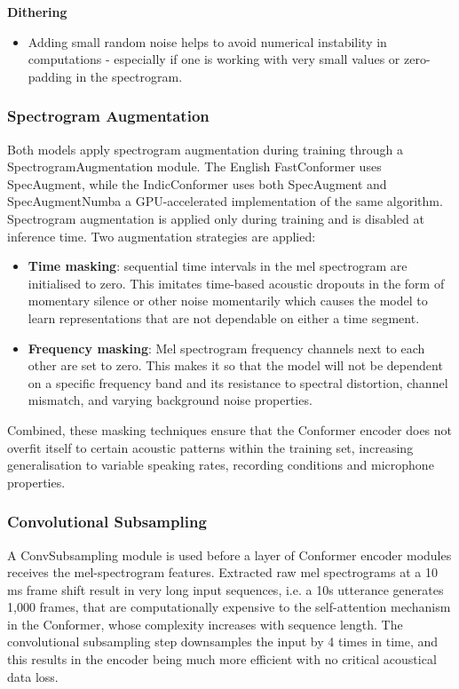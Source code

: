 \textbf{Dithering}
\begin{itemize}
    \item Adding small random noise helps to avoid numerical instability in computations - especially if one is working with very small values or zero-padding in the spectrogram.
\end{itemize}

\subsubsection{Spectrogram Augmentation}
Both models apply spectrogram augmentation during training through a SpectrogramAugmentation module. The English FastConformer uses SpecAugment, while the IndicConformer uses both SpecAugment and SpecAugmentNumba a GPU-accelerated implementation of the same algorithm. Spectrogram augmentation is applied only during training and is disabled at inference time. Two augmentation strategies are applied:

\begin{itemize}
\item \textbf{Time masking}: sequential time intervals in the mel spectrogram are initialised to zero. This imitates time-based acoustic dropouts in the form of momentary silence or other noise momentarily which causes the model to learn representations that are not dependable on either a time segment.

\item \textbf{Frequency masking}: Mel spectrogram frequency channels next to each other are set to zero. This makes it so that the model will not be dependent on a specific frequency band and its resistance to spectral distortion, channel mismatch, and varying background noise properties.
\end{itemize}

Combined, these masking techniques ensure that the Conformer encoder does not overfit itself to certain acoustic patterns within the training set, increasing generalisation to variable speaking rates, recording conditions and microphone properties.


\subsubsection{Convolutional Subsampling}
A ConvSubsampling module is used before a layer of Conformer encoder modules receives the mel-spectrogram features. Extracted raw mel spectrograms at a 10 ms frame shift result in very long input sequences, i.e. a 10s utterance generates 1,000 frames, that are computationally expensive to the self-attention mechanism in the Conformer, whose complexity increases with sequence length. The  convolutional subsampling step downsamples the input by 4 times in time, and this results in the encoder being much more efficient with no critical acoustical data loss.

